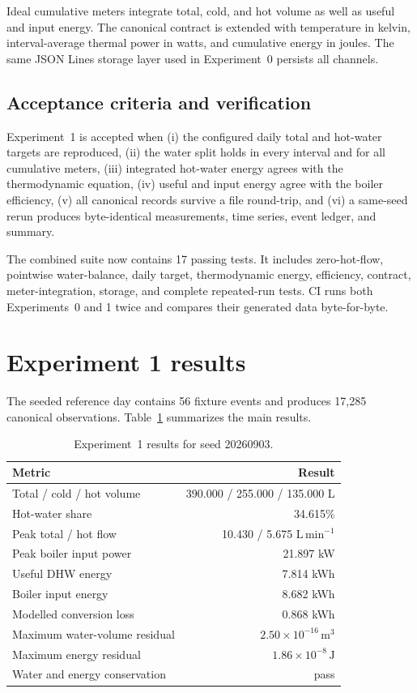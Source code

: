 \documentclass[11pt,a4paper]{article}
\begin{document}
Ideal cumulative meters integrate total, cold, and hot volume as well as useful
and input energy. The canonical contract is extended with temperature in kelvin,
interval-average thermal power in watts, and cumulative energy in joules. The
same JSON Lines storage layer used in Experiment~0 persists all channels.

\subsection{Acceptance criteria and verification}
Experiment~1 is accepted when (i) the configured daily total and hot-water
targets are reproduced, (ii) the water split holds in every interval and for all
cumulative meters, (iii) integrated hot-water energy agrees with the
thermodynamic equation, (iv) useful and input energy agree with the boiler
efficiency, (v) all canonical records survive a file round-trip, and (vi) a
same-seed rerun produces byte-identical measurements, time series, event ledger,
and summary.

The combined suite now contains 17 passing tests. It includes zero-hot-flow,
pointwise water-balance, daily target, thermodynamic energy, efficiency,
contract, meter-integration, storage, and complete repeated-run tests. CI runs
both Experiments~0 and 1 twice and compares their generated data byte-for-byte.

\section{Experiment 1 results}
The seeded reference day contains 56 fixture events and produces 17,285
canonical observations. Table~\ref{tab:experiment1-results} summarizes the main
results.

\begin{table}[htbp]
  \centering
  \caption{Experiment~1 results for seed 20260903.}
  \label{tab:experiment1-results}
  \begin{tabular}{lr}
    \toprule
    Metric & Result \\
    \midrule
    Total / cold / hot volume & 390.000 / 255.000 / 135.000 L \\
    Hot-water share & 34.615\% \\
    Peak total / hot flow & 10.430 / 5.675 $\mathrm{L\,min^{-1}}$ \\
    Peak boiler input power & 21.897 kW \\
    Useful DHW energy & 7.814 kWh \\
    Boiler input energy & 8.682 kWh \\
    Modelled conversion loss & 0.868 kWh \\
    Maximum water-volume residual & $2.50\times10^{-16}\,\mathrm{m^3}$ \\
    Maximum energy residual & $1.86\times10^{-8}\,\mathrm{J}$ \\
    Water and energy conservation & pass \\
    \bottomrule
  \end{tabular}
\end{table}
\end{document}
